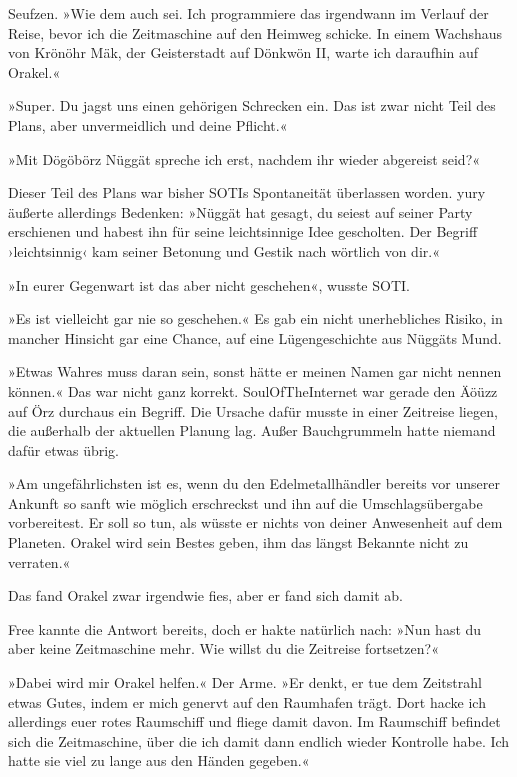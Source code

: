 Seufzen. »Wie dem auch sei. Ich programmiere das irgendwann im Verlauf der Reise, bevor ich die Zeitmaschine auf den Heimweg schicke. In einem Wachshaus von Krönöhr Mäk, der Geisterstadt auf Dönkwön II, warte ich daraufhin auf Orakel.«

»Super. Du jagst uns einen gehörigen Schrecken ein. Das ist zwar nicht Teil des Plans, aber unvermeidlich und deine Pflicht.«

»Mit Dögöbörz Nüggät spreche ich erst, nachdem ihr wieder abgereist seid?«

Dieser Teil des Plans war bisher SOTIs Spontaneität überlassen worden. yury äußerte allerdings Bedenken: »Nüggät hat gesagt, du seiest auf seiner Party erschienen und habest ihn für seine leichtsinnige Idee gescholten. Der Begriff ›leichtsinnig‹ kam seiner Betonung und Gestik nach wörtlich von dir.«

»In eurer Gegenwart ist das aber nicht geschehen«, wusste SOTI.

»Es ist vielleicht gar nie so geschehen.« Es gab ein nicht unerhebliches Risiko, in mancher Hinsicht gar eine Chance, auf eine Lügengeschichte aus Nüggäts Mund.

»Etwas Wahres muss daran sein, sonst hätte er meinen Namen gar nicht nennen können.« Das war nicht ganz korrekt. SoulOfTheInternet war gerade den Äöüzz auf Örz durchaus ein Begriff. Die Ursache dafür musste in einer Zeitreise liegen, die außerhalb der aktuellen Planung lag. Außer Bauchgrummeln hatte niemand dafür etwas übrig.

»Am ungefährlichsten ist es, wenn du den Edelmetallhändler bereits vor unserer Ankunft so sanft wie möglich erschreckst und ihn auf die Umschlagsübergabe vorbereitest. Er soll so tun, als wüsste er nichts von deiner Anwesenheit auf dem Planeten. Orakel wird sein Bestes geben, ihm das längst Bekannte nicht zu verraten.«

Das fand Orakel zwar irgendwie fies, aber er fand sich damit ab.

Free kannte die Antwort bereits, doch er hakte natürlich nach: »Nun hast du aber keine Zeitmaschine mehr. Wie willst du die Zeitreise fortsetzen?«

»Dabei wird mir Orakel helfen.« Der Arme. »Er denkt, er tue dem Zeitstrahl etwas Gutes, indem er mich genervt auf den Raumhafen trägt. Dort hacke ich allerdings euer rotes Raumschiff und fliege damit davon. Im Raumschiff befindet sich die Zeitmaschine, über die ich damit dann endlich wieder Kontrolle habe. Ich hatte sie viel zu lange aus den Händen gegeben.«

